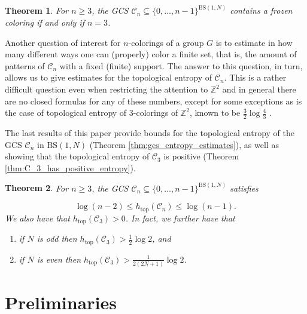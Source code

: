 \documentclass[letterpaper,10pt]{amsart}
\theoremstyle{plain}
\newtheorem{theorem}{Theorem}[section]
\newcommand{\BS}[1][N]{\mathrm{BS}(1,#1)}
\def\htop{h_{\mathrm{top}}}
\begin{document}
	\begin{theorem}\label{thm:summary_gcs_frozen_colorings}
		For $n\ge 3$, the GCS $\mathcal{C}_n\subseteq\{0,\ldots,n-1\}^{\BS}$ contains a frozen coloring if and only if $n=3$.
	\end{theorem}	

Another question of interest for $n$-colorings of a group $G$ is to estimate in how many different ways one can (properly) color a finite set, that is, the amount of patterns of $\mathcal{C}_n$ with a fixed (finite) support. The answer to this question, in turn, allows us to give estimates for the topological entropy of $\mathcal{C}_n$. This is a rather difficult question even when restricting the attention to $\mathbb{Z}^2$ and in general there are no closed formulas for any of these numbers, except for some exceptions as is the case of topological entropy of $3$-colorings of $\mathbb{Z}^2$, known to be $\frac{3}{2}\log\frac{4}{3}$ \cite{Lieb:1967zz}.


The last results of this paper provide bounds for the topological entropy of the GCS $\mathcal{C}_n$ in $\BS$ (Theorem \ref{thm:gcs_entropy_estimates}), as well as showing that the topological entropy of $\mathcal{C}_3$ is positive (Theorem \ref{thm:C_3_has_positive_entropy}).
	\begin{theorem} \label{thm:summary_gcs_entropy}
	For $n\ge 3$, the GCS $\mathcal{C}_n\subseteq\{0,\ldots,n-1\}^{\BS}$ satisfies
	
	$$
	\log(n-2)\le\htop(\mathcal{C}_n)\le\log(n-1).
	$$
	We also have that $\htop(\mathcal{C}_3)>0$. In fact, we further have that
	\begin{enumerate}
		\item if $N$ is odd then $\htop(\mathcal{C}_3)>\frac{1}{2}\log 2$, and
		\item if $N$ is even then $\htop(\mathcal{C}_3)>\frac{1}{2(2N+1)}\log 2$.
	\end{enumerate}
\end{theorem}


	\section{Preliminaries}\label{section:preliminaries}
	
\end{document}
